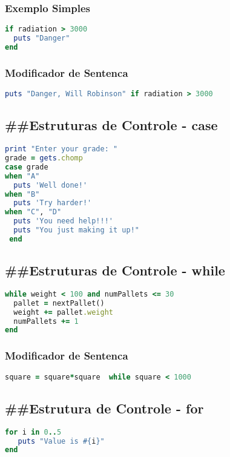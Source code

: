 \documentclass[serif,mathserif]{article}
\begin{document}
\subsubsection {Exemplo Simples}
\begin{lstlisting}[language=ruby]
if radiation > 3000
  puts "Danger"
end
\end{lstlisting}

\subsubsection {Modificador de Sentenca}
\begin{lstlisting}[language=ruby]
puts "Danger, Will Robinson" if radiation > 3000
\end{lstlisting}

\subsection{\#\#Estruturas de Controle - case} 
\begin{lstlisting}[language=ruby]
print "Enter your grade: "
grade = gets.chomp
case grade
when "A"
  puts 'Well done!'
when "B"
  puts 'Try harder!'
when "C", "D"
  puts 'You need help!!!'
  puts "You just making it up!"
 end
\end{lstlisting}


\subsection{\#\#Estruturas de Controle - while}
\begin{lstlisting}[language=ruby]
while weight < 100 and numPallets <= 30
  pallet = nextPallet()
  weight += pallet.weight
  numPallets += 1
end
\end{lstlisting}
 
\subsubsection {Modificador de Sentenca}
\begin{lstlisting}[language=ruby]
square = square*square  while square < 1000
\end{lstlisting}

\subsection{\#\#Estrutura de Controle -  for}
\begin{lstlisting}[language=ruby]
for i in 0..5
   puts "Value is #{i}"
end
\end{lstlisting}
\end{document}
